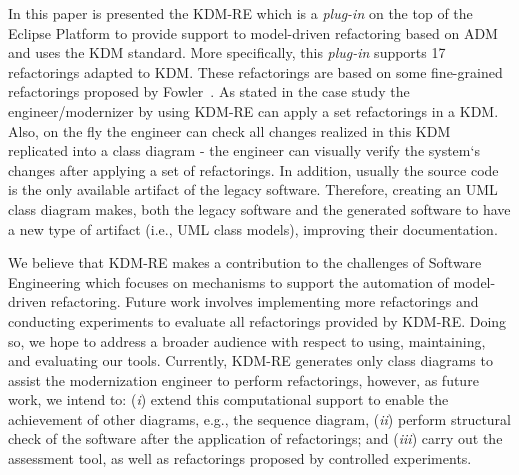 In this paper is presented the KDM-RE which is a \textit{plug-in} on the top of the Eclipse Platform to provide support to model-driven refactoring based on ADM and uses the KDM standard. More specifically, this \textit{plug-in} supports 17 refactorings adapted to KDM. These refactorings are based on some fine-grained refactorings proposed by Fowler~\cite{refactImpro}. As stated in the case study the engineer/modernizer by using KDM-RE can apply a set refactorings in a KDM. Also, on the fly the engineer can check all changes realized in this KDM replicated into a class diagram - the engineer can visually verify the system`s changes after applying a set of refactorings. In addition, usually the source code is the only available artifact of the legacy software. 
Therefore, creating an UML class diagram makes, both the legacy software and the generated software to have a new type of artifact (i.e., UML class models), improving their documentation. %



We believe that KDM-RE makes a contribution to the challenges of Software Engineering which focuses on mechanisms to support the automation of model-driven refactoring. Future work involves implementing more refactorings and conducting experiments to evaluate all refactorings provided by KDM-RE. Doing so, we hope to address a broader
audience with respect to using, maintaining, and evaluating
our tools. Currently, KDM-RE generates only class diagrams to assist the modernization engineer to perform refactorings, however, as future work, we intend to: (\textit{i}) extend this computational support to enable the achievement of other diagrams, e.g.,  the sequence diagram, (\textit{ii}) perform structural check of the software after the application of refactorings; and (\textit{iii}) carry out the assessment tool, as well as refactorings proposed by controlled experiments. %